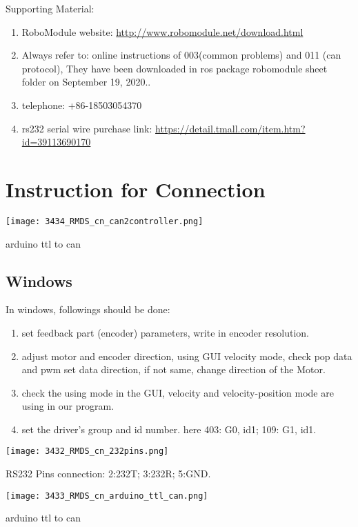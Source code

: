 Supporting Material:
\begin{enumerate}
	\item RoboModule website: \url{http://www.robomodule.net/download.html}
    \item Always refer to: online instructions of 003(common problems) and 011 (can protocol), 
      They have been downloaded in ros package robomodule sheet folder on {\color{red} September 19, 2020.}.
	\item telephone: +86-18503054370
    \item rs232 serial wire purchase link: \url{https://detail.tmall.com/item.htm?id=39113690170 }
\end{enumerate}


\section{Instruction for Connection}
\begin{marginfigure}[-2cm]
	\texttt{[image: 3434\_RMDS\_cn\_can2controller.png]}
	\caption[arduino ttl to can ]{arduino ttl to can }
\end{marginfigure}
\subsection{Windows}

In windows,  followings should be done:
\begin{enumerate}
	\item set feedback part (encoder) parameters, write in encoder resolution.
	\item adjust motor and encoder direction, using GUI velocity mode, check pop data and pwm set data direction, if not same, change direction of the Motor.
    \item check the using mode in the GUI, velocity and velocity-position mode are using in our program.
    \item set the driver's group and id number. here {\color{red}403: G0, id1; 109: G1, id1}.
\end{enumerate}
\begin{marginfigure}
	\texttt{[image: 3432\_RMDS\_cn\_232pins.png]}
	\caption[RS232 Pins]{RS232 Pins connection: {\color{red} 2:232T; 3:232R; 5:GND.} }
\end{marginfigure}

\begin{marginfigure}
	\texttt{[image: 3433\_RMDS\_cn\_arduino\_ttl\_can.png]}
	\caption[arduino ttl to can ]{arduino ttl to can }
\end{marginfigure}

